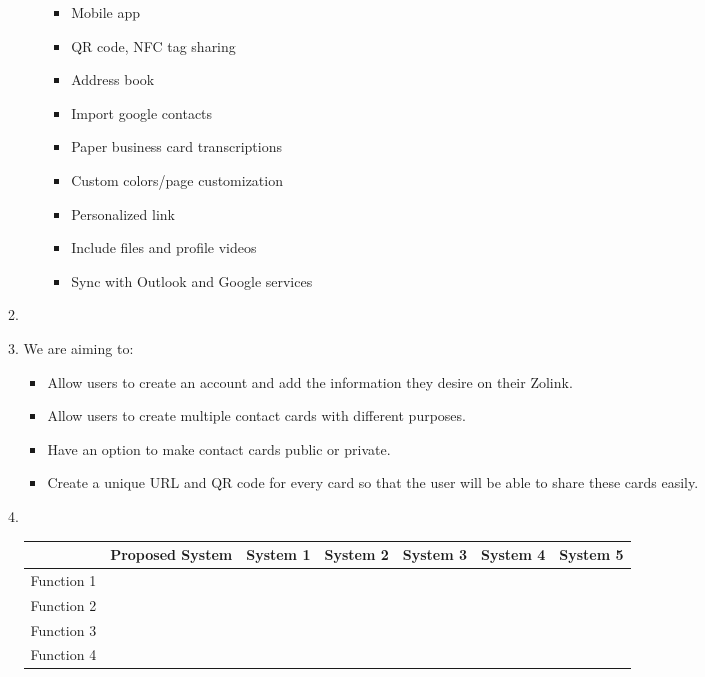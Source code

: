\documentclass[12pt]{article}%
\begin{document}
\begin{enumerate}
\begin{enumerate}
\begin{enumerate}
                \begin{itemize}
                    \item Mobile app
                    \item QR code, NFC tag sharing
                    \item Address book
                    \item Import google contacts
                    \item Paper business card transcriptions
                    \item Custom colors/page customization
                    \item Personalized link
                    \item Include files and profile videos
                    \item Sync with Outlook and Google services
                \end{itemize}
            \end{enumerate}
            \item \item We are aiming to:
            \begin{itemize}
            	\item Allow users to create an account and add the information they desire on their Zolink.
            	\item Allow users to create multiple contact cards with different purposes.
            	\item Have an option to make contact cards public or private.
            	\item Create a unique URL and QR code for every card so that the user will be able to share these cards easily.
            \end{itemize}
            \item \hspace{1cm} \\
            \begin{tabular}{|l|l|l|l|l|l|l|}
                \hline
                 & Proposed System & System 1 & System 2 & System 3 & System 4 & System 5 \\
                 \hline
                Function 1 & \\
                Function 2 & \\
                Function 3 & \\
                Function 4 & \\
                 \hline
            \end{tabular}
        \end{enumerate}
\end{enumerate}
\end{document}
